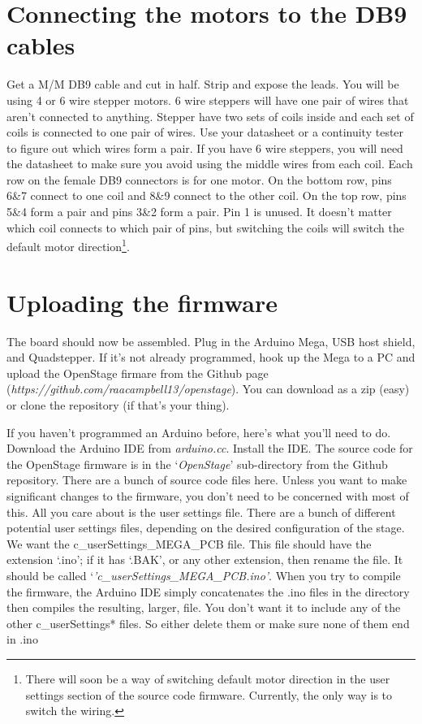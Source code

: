 \documentclass[11pt]{report} %
\begin{document}
\clearpage

\section{Connecting the motors to the DB9 cables}
Get a M/M DB9 cable and cut in half. Strip and expose the leads. You will be using 4 or 6 wire stepper motors. 6 wire steppers will have one pair of wires that aren't connected to anything. Stepper have two sets of coils inside and each set of coils is connected to one pair of wires. Use your datasheet or a continuity tester to figure out which wires form a pair. If you have 6 wire steppers, you will need the datasheet to make sure you avoid using the middle wires from each coil. Each row on the female DB9 connectors is for one motor. On the bottom row, pins 6\&7 connect to one coil and 8\&9 connect to the other coil. On the top row, pins 5\&4 form a pair and pins 3\&2 form a pair. Pin 1 is unused. It doesn't matter which coil connects to which pair of pins, but switching the coils will switch the default motor direction\footnote{There will soon be a way of switching default motor direction in the user settings section of the source code firmware. Currently, the only way is to switch the wiring.}.



\section{Uploading the firmware}
The board should now be assembled. Plug in the Arduino Mega, USB host shield, and Quadstepper. If it's not already programmed, hook up the Mega to a PC and upload the OpenStage firmare from the Github page (\textit{https://github.com/raacampbell13/openstage}). You can download as a zip (easy) or clone the repository (if that's your thing). 

If you haven't programmed an Arduino before, here's what you'll need to do. Download the Arduino IDE from \textit{arduino.cc}. Install the IDE. The source code for the OpenStage firmware is in the `\textit{OpenStage}' sub-directory from the Github repository. There are a bunch of source code files here. Unless you want to make significant changes to the firmware, you don't need to be concerned with most of this. All you care about is the user settings file. There are a bunch of different potential user settings files, depending on the desired configuration of the stage. We want the c\_userSettings\_MEGA\_PCB file. This file should have the extension `.ino'; if it has `.BAK', or any other extension, then rename the file. It should be called `\textit{'c\_userSettings\_MEGA\_PCB.ino'}. When you try to compile the firmware, the Arduino IDE simply concatenates the .ino files in the directory then compiles the resulting, larger, file. You don't want it to include any of the other c\_userSettings* files. So either delete them or make sure none of them end in .ino 
\end{document}
